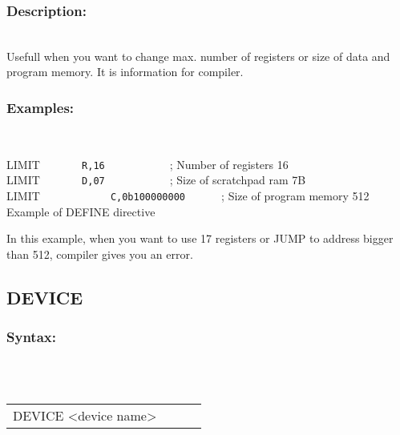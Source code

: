 {        \subsubsection{Description:}\\
        Usefull when you want to change max. number of registers or size of  data and program memory. It is information for compiler.\\

        \subsubsection{Examples:}\\
                        \begin{code}[h!]
                        { \color{highlight_directive} LIMIT }   \verb`     `
                        { \color{highlight_symbol}\verb' R,16' }  \verb`          `   { \color{highlight_comment} ; Number of registers 16 }\\
                        { \color{highlight_directive} LIMIT }   \verb`     `
                        { \color{highlight_symbol}\verb' D,07' }  \verb`          `   { \color{highlight_comment} ; Size of scratchpad ram 7B }\\
                        { \color{highlight_directive} LIMIT }   \verb`          `
                        { \color{highlight_symbol}\verb' C,0b100000000' }  \verb`     `   { \color{highlight_comment} ; Size of program memory 512}\\
                        \caption{Example of DEFINE directive}
                        \end{code}
        In this example, when you want to use 17 registers or JUMP to address bigger than 512, compiler gives you an error.

        \subsection{DEVICE}
        \subsubsection{Syntax:}\\
        \\ {
            \texttt{}
            \begin{tabular}[h!]{llll}
                    { \color{highlight_directive} DEVICE } { \color{highlight_symbol} <device name> }
                    { \color{highlight_comment}  }\\
            \end{tabular}
            }\\
            \\
}
